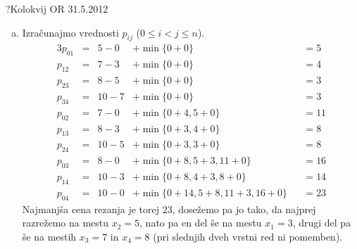 \begin{naloga}{?}{Kolokvij OR 31.5.2012}
\begin{odgovor}
\begin{enumerate}[(a)]
\item Izračunajmo vrednosti $p_{ij}$ ($0 \le i < j \le n$).
\begin{alignat*}{3}
p_{01} &=&  5 - 0 &+ \min\{0+0\} &&= 5 \\
p_{12} &=&  7 - 3 &+ \min\{0+0\} &&= 4 \\
p_{23} &=&  8 - 5 &+ \min\{0+0\} &&= 3 \\
p_{34} &=& 10 - 7 &+ \min\{0+0\} &&= 3 \\
p_{02} &=&  7 - 0 &+ \min\{0+4, 5+0\} &&= 11 \\
p_{13} &=&  8 - 3 &+ \min\{0+3, 4+0\} &&= 8 \\
p_{24} &=& 10 - 5 &+ \min\{0+3, 3+0\} &&= 8 \\
p_{03} &=&  8 - 0 &+ \min\{0+8, 5+3, 11+0\} &&= 16 \\
p_{14} &=& 10 - 3 &+ \min\{0+8, 4+3, 8+0\} &&= 14 \\
p_{04} &=& 10 - 0 &+ \min\{0+14, 5+8, 11+3, 16+0\} &&= 23
\end{alignat*}
Najmanjša cena rezanja je torej $23$, dosežemo pa jo tako,
da najprej razrežemo na mestu $x_2 = 5$,
nato pa en del še na mestu $x_1 = 3$,
drugi del pa še na mestih $x_3 = 7$ in $x_4 = 8$
(pri slednjih dveh vrstni red ni pomemben).
\end{enumerate}
\end{odgovor}
\end{naloga}
